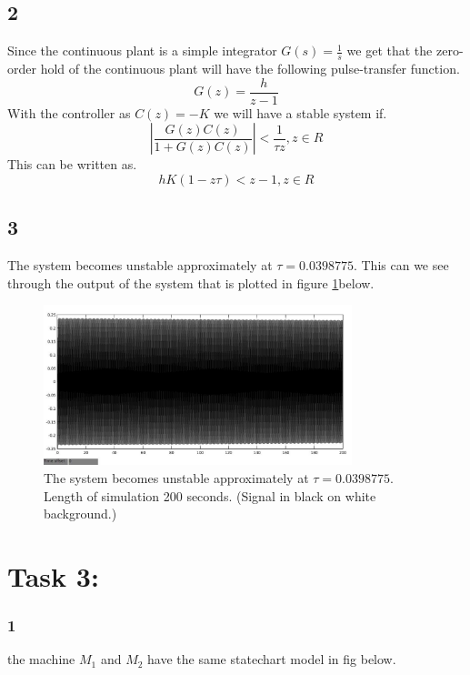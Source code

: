 \documentclass[10pt,a4paper]{article}
\begin{document}
\subsection*{2}
Since the continuous plant is a simple integrator $G(s)=\frac{1}{s}$ we get that the zero-order hold of the continuous plant will have the following pulse-transfer function.
\begin{equation*}
G(z)=\frac{h}{z-1}
\end{equation*}
With the controller as $C(z)=-K$ we will have a stable system if.
\begin{equation*}
|\frac{G(z)C(z)}{1+G(z)C(z)}|<\frac{1}{\tau z},	z\in R
\end{equation*}
This can be written as.
\begin{equation*}
hK(1-z\tau)<z-1,	z\in R
\end{equation*}
\subsection*{3}
The system becomes unstable approximately at $\tau=0.0398775$. This can we see through the output of the system that is plotted in figure \ref{2}below.
\begin{figure}[!h]\label{2}
  \centering
    \includegraphics[width=0.8\textwidth]{stable.jpg}
      \caption{The system becomes unstable approximately at $\tau=0.0398775$. Length of simulation 200 seconds. (Signal in black on white background.)}
\end{figure}
\section*{Task 3:}
\subsubsection*{1}
the machine $M_1$ and $M_2$ have the same statechart model in fig below.
\begin{center}


\end{center}
\end{document}
